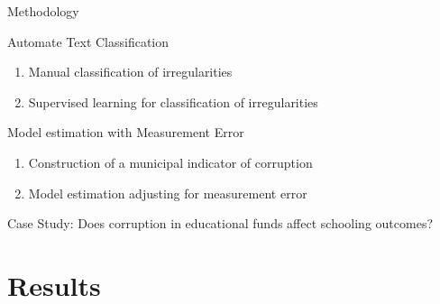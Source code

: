 \documentclass[handout,t,usenames,dvipsnames]{beamer}
\begin{document}
\begin{frame}{Methodology}
\vspace{0.8em}

{\color{emap-azul-escuro}Automate Text Classification}
\begin{enumerate}
\item Manual classification of irregularities
\item Supervised learning for classification of irregularities
\end{enumerate}

\vspace{0.8em}
{\color{emap-azul-escuro}Model estimation with Measurement Error}\\
\begin{enumerate}
\item Construction of a municipal indicator of corruption
\item Model estimation adjusting for measurement error
\end{enumerate}

\vspace{2em}
{\color{emap-azul-escuro}\large Case Study}: Does corruption in educational funds affect schooling outcomes?


\end{frame}




\section{Results}
\end{document}
